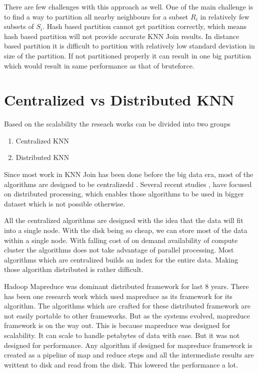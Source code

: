\medskip

There are few challenges with this approach as well. One
of the main challenge is to find a way to partition all nearby neighbours for a subset
$R_i$ in relatively few subsets of $S_i$. Hash based partition cannot
get partition correctly, which means hash based partition will not
provide accurate KNN Join results. In distance based partition it is difficult to partition
with relatively low standard deviation in size of the partition. If
not partitioned properly it can result in one big partition which
would result in same performance as that of bruteforce.

\bigskip


\section{Centralized vs Distributed KNN}

Based on the scalability the reseach works can be divided into two
groups
\begin{enumerate}
\item Centralized KNN
\item Distributed KNN
\end{enumerate}

Since most work in KNN Join has been done before the big data era,
most of the algorithms are designed to be centralizedd
\cite{jagadish_idistance:_2005} \cite{xia_gorder:_2004}
\cite{bohm_k-nearest_2004} \cite{kuan_fast_1997} \cite{yu_high-dimensional_2010}.
Several recent studies \cite{stupar_rankreduceprocessing_2010},
\cite{lu_efficient_2012} have focused on distributed
processing, which enables those algorithms to be used in bigger
dataset which is not possible otherwise.

\medskip

All the centralized algorithms are designed with the idea that the
data will fit into a single node. With the disk being so cheap, we can
store most of the data within a single node. With falling cost of on
demand availability of compute cluster the algorithms does not take
advantage of parallel processing. Most algorithms which are
centralized builds an index for the entire data. Making those
algorithm distributed is rather difficult.

\medskip

Hadoop Mapreduce was dominant distributed framework for last 8
years. There has been one research work \cite{lu_efficient_2012} which
used mapreduce as its framework for its algorithm. The algorithms
which are crafted for these distributed framework are not easily
portable to other frameworks. But as the
systems evolved, mapreduce framework is on the way out. This is
because mapreduce was designed for scalability. It can scale to handle
petabytes of data with ease. But it was not designed for
performance. Any algorithm if designed for mapreduce framework is
created as a pipeline of map and reduce steps and all the
intermediate results are writtent to disk and read from the disk. This
lowered the performance a lot.

